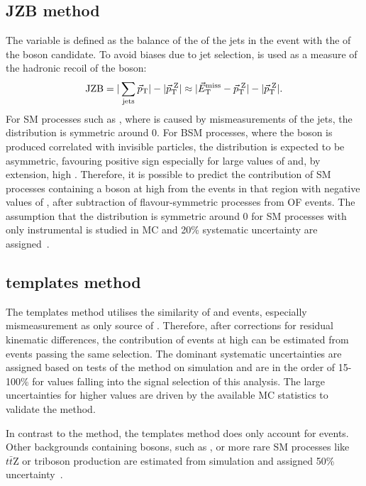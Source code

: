 \subsection{JZB method}
The \JZB variable is defined as the balance of the \pt of the jets in the event with the \pt of the \Z boson candidate. To avoid biases due to jet selection, \METVec is used as a measure of the hadronic recoil of the \Z boson:
\begin{equation}
\textrm{JZB} = | \sum\limits_{\mathrm{jets}}\vec{p}_{\mathrm{T}}| - | \vec{p}_{\mathrm{T}}^{\text{ }\mathrm{Z}}| \approx | \vec{E}_{\mathrm{T}}^{\mathrm{miss}} -  \vec{p}_{\mathrm{T}}^{\text{ }\mathrm{ Z}}| - |\vec{p}_{\mathrm{T}}^{\text{ }\mathrm{Z}}| .
\end{equation}
For SM processes such as \zjets, where \MET is caused by mismeasurements of the jets, the \JZB distribution is symmetric around 0. For BSM processes, where the \Z boson is produced correlated with invisible particles, the \JZB distribution is expected to be asymmetric, favouring positive sign especially for large values of \JZB and, by extension, high \MET. Therefore, it is possible to predict the contribution of SM processes containing a \Z boson at high \MET from the events in that region with negative values of \JZB, after subtraction of flavour-symmetric processes from OF events. The assumption that the \JZB distribution is symmetric around 0 for SM processes with only instrumental \MET is studied in MC and 20\% systematic uncertainty are assigned~\cite{Khachatryan:2015lwa}.
\subsection{\MET templates method}
The \MET templates method utilises the similarity of \zjets and \gjets events, especially mismeasurement as only source of \MET. Therefore, after corrections for residual kinematic differences, the contribution of \zjets events at high \MET can be estimated from \gjets events passing the same selection. The dominant systematic uncertainties are assigned based on tests of the method on simulation and are in the order of 15-100\% for \MET values falling into the signal selection of this analysis. The large uncertainties for higher \MET values are driven by the available MC statistics to validate the method. 

In contrast to the \JZB method, the \MET templates method does only account for \zjets events. Other backgrounds containing \Z bosons, such as \WZ, \ZZ or more rare SM processes like $t\bar{t}\mathrm{Z}$ or triboson production are estimated from simulation and assigned 50\% uncertainty~\cite{Khachatryan:2015lwa}. 
